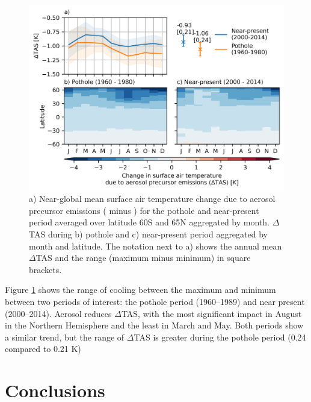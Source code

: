\begin{figure}
    \centering
    \includegraphics{Chapter4/Figs/tas_range.png}
    \caption[Change in surface air temperature due to aerosol precursor emissions for 1960--1989 and 2000-2014]{a) Near-global mean surface air temperature change due to aerosol precursor emissions (\hist{} minus \histpiaer{}) for the pothole and near-present period averaged over latitude 60\textdegree S and 65\textdegree N aggregated by month. $\Delta$TAS during b) pothole and c) near-present period aggregated by month and latitude. The notation next to a) shows the annual mean $\Delta$TAS and the range (maximum minus minimum) in square brackets.}
    \label{fig:ch4:tas-range}
\end{figure}

Figure \ref{fig:ch4:tas-range} shows the range of cooling between the maximum and minimum between two periods of interest: the pothole period (1960--1989) and near present (2000--2014). Aerosol reduces $\Delta$TAS, with the most significant impact in August in the Northern Hemisphere and the least in March and May. Both periods show a similar trend, but the range of $\Delta$TAS is greater during the pothole period (0.24 compared to 0.21 K)

\section{Conclusions}


